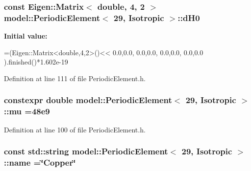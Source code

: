 \subsubsection[{d\+H0}]{\setlength{\rightskip}{0pt plus 5cm}const Eigen\+::\+Matrix$<$ double, 4, 2 $>$ {\bf model\+::\+Periodic\+Element}$<$ 29, {\bf Isotropic} $>$\+::d\+H0\hspace{0.3cm}{\ttfamily [static]}}\label{structmodel_1_1_periodic_element_3_0129_00_01_isotropic_01_4_ada99a134c11f80b15b76d975405d6b02}
{\bfseries Initial value\+:}
\begin{DoxyCode}
=(Eigen::Matrix<double,4,2>()<<
                                                                        0.0,0.0,
                                                                        0.0,0.0,
                                                                        0.0,0.0,
                                                                        0.0,0.0 
                                                                        ).finished()*1.602e-19
\end{DoxyCode}


Definition at line 111 of file Periodic\+Element.\+h.

\hypertarget{structmodel_1_1_periodic_element_3_0129_00_01_isotropic_01_4_a742a2212eb30c87dba2656e8e1652a31}{}
\subsubsection[{mu}]{\setlength{\rightskip}{0pt plus 5cm}constexpr double {\bf model\+::\+Periodic\+Element}$<$ 29, {\bf Isotropic} $>$\+::mu =48e9\hspace{0.3cm}{\ttfamily [static]}}\label{structmodel_1_1_periodic_element_3_0129_00_01_isotropic_01_4_a742a2212eb30c87dba2656e8e1652a31}


Definition at line 100 of file Periodic\+Element.\+h.

\hypertarget{structmodel_1_1_periodic_element_3_0129_00_01_isotropic_01_4_aa44d613baee4052fbb765b9c9dbdf01b}{}
\subsubsection[{name}]{\setlength{\rightskip}{0pt plus 5cm}const std\+::string {\bf model\+::\+Periodic\+Element}$<$ 29, {\bf Isotropic} $>$\+::name =\char`\"{}Copper\char`\"{}\hspace{0.3cm}{\ttfamily [static]}}\label{structmodel_1_1_periodic_element_3_0129_00_01_isotropic_01_4_aa44d613baee4052fbb765b9c9dbdf01b}



